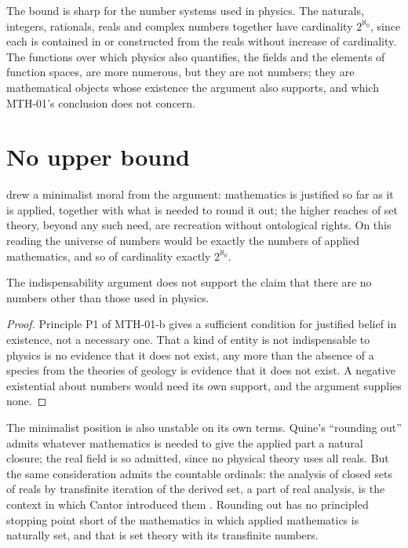 \documentclass{situationist-preprint}
\begin{document}
The bound is sharp for the number systems used in physics. The naturals, integers, rationals, reals and complex numbers together have cardinality $2^{\aleph_0}$, since each is contained in or constructed from the reals without increase of cardinality. The functions over which physics also quantifies, the fields and the elements of function spaces, are more numerous, but they are not numbers; they are mathematical objects whose existence the argument also supports, and which MTH-01's conclusion does not concern.

\section{No upper bound}\label{s:upper}

\citet{Quine1986} drew a minimalist moral from the argument: mathematics is justified so far as it is applied, together with what is needed to round it out; the higher reaches of set theory, beyond any such need, are recreation without ontological rights. On this reading the universe of numbers would be exactly the numbers of applied mathematics, and so of cardinality exactly $2^{\aleph_0}$.

\begin{proposition}\label{p:noupper}
The indispensability argument does not support the claim that there are no numbers other than those used in physics.
\end{proposition}

\begin{proof}
Principle P1 of MTH-01-b gives a sufficient condition for justified belief in existence, not a necessary one. That a kind of entity is not indispensable to physics is no evidence that it does not exist, any more than the absence of a species from the theories of geology is evidence that it does not exist. A negative existential about numbers would need its own support, and the argument supplies none.
\end{proof}

The minimalist position is also unstable on its own terms. Quine's \enquote{rounding out} admits whatever mathematics is needed to give the applied part a natural closure; the real field is so admitted, since no physical theory uses all reals. But the same consideration admits the countable ordinals: the analysis of closed sets of reals by transfinite iteration of the derived set, a part of real analysis, is the context in which Cantor introduced them \citep{Cantor1883}. Rounding out has no principled stopping point short of the mathematics in which applied mathematics is naturally set, and that is set theory with its transfinite numbers.
\end{document}
